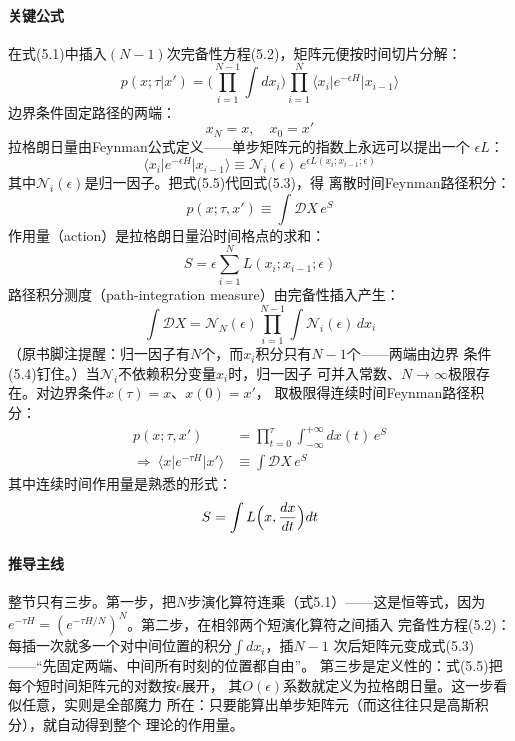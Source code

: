 \paragraph{关键公式}
在式(5.1)中插入$(N-1)$次完备性方程(5.2)，矩阵元便按时间切片分解：
\begin{equation*}
p(x;\tau\vert x')=\Biggl(\prod_{i=1}^{N-1}\int dx_{i}\Biggr)\prod_{i=1}^{N}
\langle x_{i}\vert e^{-\epsilon H}\vert x_{i-1}\rangle
\tag{5.3}
\end{equation*}
边界条件固定路径的两端：
\begin{equation*}
x_{N}=x,\quad x_{0}=x'
\tag{5.4}
\end{equation*}
拉格朗日量由Feynman公式定义——单步矩阵元的指数上永远可以提出一个
$\epsilon L$：
\begin{equation*}
\langle x_{i}\vert e^{-\epsilon H}\vert x_{i-1}\rangle\equiv
\mathcal{N}_{i}(\epsilon)\,e^{\epsilon L(x_{i};x_{i-1};\epsilon)}
\tag{5.5}
\end{equation*}
其中$\mathcal{N}_{i}(\epsilon)$是归一因子。把式(5.5)代回式(5.3)，得
离散时间Feynman路径积分：
\begin{equation*}
p(x;\tau,x')\equiv\int\mathcal{D}X\,e^{S}
\tag{5.6}
\end{equation*}
作用量（action）是拉格朗日量沿时间格点的求和：
\begin{equation*}
S=\epsilon\sum_{i=1}^{N}L(x_{i};x_{i-1};\epsilon)
\tag{5.7}
\end{equation*}
路径积分测度（path-integration measure）由完备性插入产生：
\begin{equation*}
\int\mathcal{D}X=\mathcal{N}_{N}(\epsilon)\prod_{i=1}^{N-1}\int
\mathcal{N}_{i}(\epsilon)\,dx_{i}
\end{equation*}
（原书脚注提醒：归一因子有$N$个，而$x_i$积分只有$N-1$个——两端由边界
条件(5.4)钉住。）当$\mathcal{N}_{i}$不依赖积分变量$x_{i}$时，归一因子
可并入常数、$N\to\infty$极限存在。对边界条件$x(\tau)=x$、$x(0)=x'$，
取极限得连续时间Feynman路径积分：
\begin{align*}
p(x;\tau,x')&=\prod_{t=0}^{\tau}\int_{-\infty}^{+\infty}dx(t)\,e^{S}\\
\Rightarrow\ \langle x\vert e^{-\tau H}\vert x'\rangle&\equiv\int\mathcal{D}X\,e^{S}
\tag{5.8}
\end{align*}
其中连续时间作用量是熟悉的形式：
\begin{equation*}
S=\int L\Bigl(x,\frac{dx}{dt}\Bigr)dt
\end{equation*}

\paragraph{推导主线}
整节只有三步。第一步，把$N$步演化算符连乘（式5.1）——这是恒等式，因为
$e^{-\tau H}=(e^{-\tau H/N})^{N}$。第二步，在相邻两个短演化算符之间插入
完备性方程(5.2)：每插一次就多一个对中间位置的积分$\int dx_i$，插$N-1$
次后矩阵元变成式(5.3)——“先固定两端、中间所有时刻的位置都自由”。
第三步是定义性的：式(5.5)把每个短时间矩阵元的对数按$\epsilon$展开，
其$O(\epsilon)$系数就定义为拉格朗日量。这一步看似任意，实则是全部魔力
所在：只要能算出单步矩阵元（而这往往只是高斯积分），就自动得到整个
理论的作用量。

